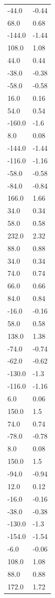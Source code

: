\begin{longtable}{ll}
-44.0 & -0.44 \\
68.0 & 0.68 \\
-144.0 & -1.44 \\
108.0 & 1.08 \\
44.0 & 0.44 \\
-38.0 & -0.38 \\
-58.0 & -0.58 \\
16.0 & 0.16 \\
54.0 & 0.54 \\
-160.0 & -1.6 \\
8.0 & 0.08 \\
-144.0 & -1.44 \\
-116.0 & -1.16 \\
-58.0 & -0.58 \\
-84.0 & -0.84 \\
166.0 & 1.66 \\
34.0 & 0.34 \\
58.0 & 0.58 \\
232.0 & 2.32 \\
88.0 & 0.88 \\
34.0 & 0.34 \\
74.0 & 0.74 \\
66.0 & 0.66 \\
84.0 & 0.84 \\
-16.0 & -0.16 \\
58.0 & 0.58 \\
138.0 & 1.38 \\
-74.0 & -0.74 \\
-62.0 & -0.62 \\
-130.0 & -1.3 \\
-116.0 & -1.16 \\
6.0 & 0.06 \\
150.0 & 1.5 \\
74.0 & 0.74 \\
-78.0 & -0.78 \\
8.0 & 0.08 \\
150.0 & 1.5 \\
-94.0 & -0.94 \\
12.0 & 0.12 \\
-16.0 & -0.16 \\
-38.0 & -0.38 \\
-130.0 & -1.3 \\
-154.0 & -1.54 \\
-6.0 & -0.06 \\
108.0 & 1.08 \\
88.0 & 0.88 \\
172.0 & 1.72 \\

\end{longtable}
